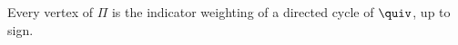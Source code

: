 \begin{lemma}\label{sh-0402}
Every vertex of $\Pi$ is the indicator weighting of a directed cycle of $\quiv$, up to sign.
\end{lemma}